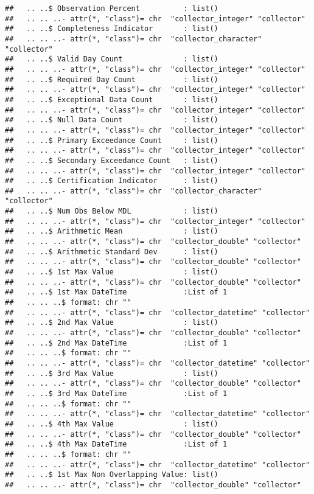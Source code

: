 \documentclass[]{article}
\begin{document}
\begin{verbatim}
##   .. ..$ Observation Percent          : list()
##   .. .. ..- attr(*, "class")= chr  "collector_integer" "collector"
##   .. ..$ Completeness Indicator       : list()
##   .. .. ..- attr(*, "class")= chr  "collector_character" "collector"
##   .. ..$ Valid Day Count              : list()
##   .. .. ..- attr(*, "class")= chr  "collector_integer" "collector"
##   .. ..$ Required Day Count           : list()
##   .. .. ..- attr(*, "class")= chr  "collector_integer" "collector"
##   .. ..$ Exceptional Data Count       : list()
##   .. .. ..- attr(*, "class")= chr  "collector_integer" "collector"
##   .. ..$ Null Data Count              : list()
##   .. .. ..- attr(*, "class")= chr  "collector_integer" "collector"
##   .. ..$ Primary Exceedance Count     : list()
##   .. .. ..- attr(*, "class")= chr  "collector_integer" "collector"
##   .. ..$ Secondary Exceedance Count   : list()
##   .. .. ..- attr(*, "class")= chr  "collector_integer" "collector"
##   .. ..$ Certification Indicator      : list()
##   .. .. ..- attr(*, "class")= chr  "collector_character" "collector"
##   .. ..$ Num Obs Below MDL            : list()
##   .. .. ..- attr(*, "class")= chr  "collector_integer" "collector"
##   .. ..$ Arithmetic Mean              : list()
##   .. .. ..- attr(*, "class")= chr  "collector_double" "collector"
##   .. ..$ Arithmetic Standard Dev      : list()
##   .. .. ..- attr(*, "class")= chr  "collector_double" "collector"
##   .. ..$ 1st Max Value                : list()
##   .. .. ..- attr(*, "class")= chr  "collector_double" "collector"
##   .. ..$ 1st Max DateTime             :List of 1
##   .. .. ..$ format: chr ""
##   .. .. ..- attr(*, "class")= chr  "collector_datetime" "collector"
##   .. ..$ 2nd Max Value                : list()
##   .. .. ..- attr(*, "class")= chr  "collector_double" "collector"
##   .. ..$ 2nd Max DateTime             :List of 1
##   .. .. ..$ format: chr ""
##   .. .. ..- attr(*, "class")= chr  "collector_datetime" "collector"
##   .. ..$ 3rd Max Value                : list()
##   .. .. ..- attr(*, "class")= chr  "collector_double" "collector"
##   .. ..$ 3rd Max DateTime             :List of 1
##   .. .. ..$ format: chr ""
##   .. .. ..- attr(*, "class")= chr  "collector_datetime" "collector"
##   .. ..$ 4th Max Value                : list()
##   .. .. ..- attr(*, "class")= chr  "collector_double" "collector"
##   .. ..$ 4th Max DateTime             :List of 1
##   .. .. ..$ format: chr ""
##   .. .. ..- attr(*, "class")= chr  "collector_datetime" "collector"
##   .. ..$ 1st Max Non Overlapping Value: list()
##   .. .. ..- attr(*, "class")= chr  "collector_double" "collector"

\end{verbatim}
\end{document}
